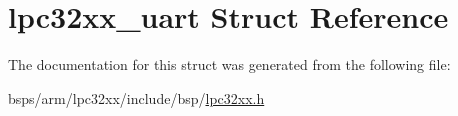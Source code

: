 \hypertarget{structlpc32xx__uart}{}\section{lpc32xx\+\_\+uart Struct Reference}
\label{structlpc32xx__uart}


The documentation for this struct was generated from the following file\+:\begin{DoxyCompactItemize}
\item 
bsps/arm/lpc32xx/include/bsp/\mbox{\hyperlink{lpc32xx_8h}{lpc32xx.\+h}}\end{DoxyCompactItemize}
